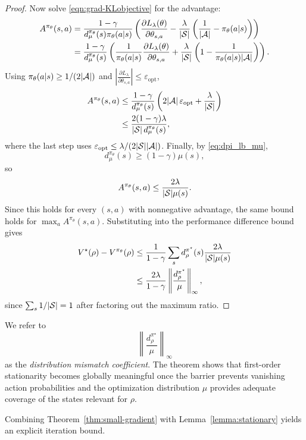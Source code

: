 \begin{proof}
Now solve \eqref{eqn:grad-KLobjective} for the advantage:
\begin{align*}
A^{\pi_\theta}(s,a)
&=
\frac{1-\gamma}{d_\mu^{\pi_\theta}(s)\pi_\theta(a|s)}
\left(
\frac{\partial L_\lambda(\theta)}{\partial \theta_{s,a}}
-
\frac{\lambda}{|\mathcal{S}|}\left(\frac{1}{|\mathcal{A}|}-\pi_\theta(a|s)\right)
\right) \\
&=
\frac{1-\gamma}{d_\mu^{\pi_\theta}(s)}
\left(
\frac{1}{\pi_\theta(a|s)}\frac{\partial L_\lambda(\theta)}{\partial \theta_{s,a}}
+
\frac{\lambda}{|\mathcal{S}|}
\left(1-\frac{1}{\pi_\theta(a|s)|\mathcal{A}|}\right)
\right).
\end{align*}
Using $\pi_\theta(a|s)\ge 1/(2|\mathcal{A}|)$ and
$\left|\frac{\partial L_\lambda}{\partial \theta_{s,a}}\right|\le \varepsilon_{\mathrm{opt}}$,
\begin{align*}
A^{\pi_\theta}(s,a)
&\le
\frac{1-\gamma}{d_\mu^{\pi_\theta}(s)}
\left(
2|\mathcal{A}|\,\varepsilon_{\mathrm{opt}}
+
\frac{\lambda}{|\mathcal{S}|}
\right) \\
&\le
\frac{2(1-\gamma)\lambda}{|\mathcal{S}|\,d_\mu^{\pi_\theta}(s)},
\end{align*}
where the last step uses $\varepsilon_{\mathrm{opt}}\le \lambda/(2|\mathcal{S}||\mathcal{A}|)$.
Finally, by \eqref{eq:dpi_lb_mu},
\[
d_\mu^{\pi_\theta}(s)\ge (1-\gamma)\mu(s),
\]
so
\[
A^{\pi_\theta}(s,a)\le \frac{2\lambda}{|\mathcal{S}|\mu(s)}.
\]
Since this holds for every $(s,a)$ with nonnegative advantage, the same bound holds for
$\max_a A^{\pi_\theta}(s,a)$. Substituting into the performance difference bound gives
\begin{align*}
V^\star(\rho)-V^{\pi_\theta}(\rho)
&\le
\frac{1}{1-\gamma}\sum_s d_\rho^{\pi^\star}(s)\frac{2\lambda}{|\mathcal{S}|\mu(s)} \\
&\le
\frac{2\lambda}{1-\gamma}
\left\|
\frac{d_\rho^{\pi^\star}}{\mu}
\right\|_\infty,
\end{align*}
since $\sum_s 1/|\mathcal{S}|=1$ after factoring out the maximum ratio.
\end{proof}

We refer to
\[
\left\|
\frac{d_\rho^{\pi^\star}}{\mu}
\right\|_\infty
\]
as the \emph{distribution mismatch coefficient}. The theorem shows that first-order stationarity
becomes globally meaningful once the barrier prevents vanishing action probabilities and the
optimization distribution $\mu$ provides adequate coverage of the states relevant for $\rho$.

Combining Theorem~\ref{thm:small-gradient} with Lemma~\ref{lemma:stationary} yields
an explicit iteration bound.

